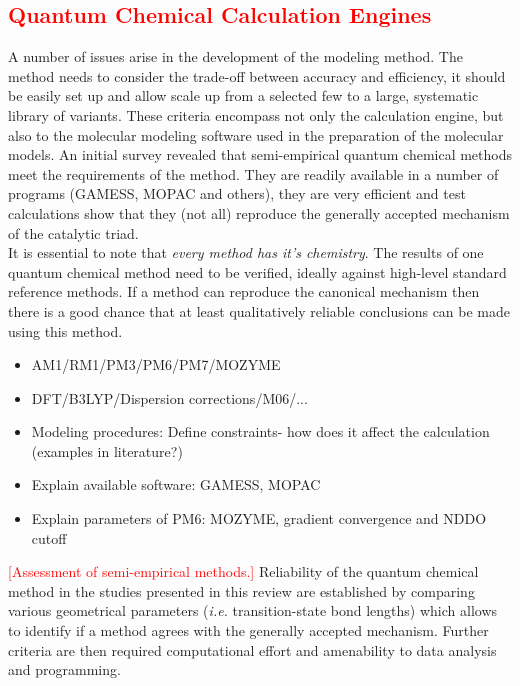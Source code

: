 \subsection{\textcolor{red}{Quantum Chemical Calculation Engines}}\label{sec:quantum_chemical_methods}
A number of issues arise in the development of the modeling method.
The method needs to consider the trade-off between accuracy and efficiency, it should be easily set up and allow scale up from a selected few to a large, systematic library of variants.
These criteria encompass not only the calculation engine, but also to the molecular modeling software used in the preparation of the molecular models.
An initial survey revealed that semi-empirical quantum chemical methods meet the requirements of the method.
They are readily available in a number of programs (GAMESS, MOPAC and others), they are very efficient and test calculations show that they (not all) reproduce the generally accepted mechanism of the catalytic triad.\\
It is essential to note that \textit{every method has it's chemistry}.
The results of one quantum chemical method need to be verified, ideally against high-level standard reference methods.
If a method can reproduce the canonical mechanism then there is a good chance that at least qualitatively reliable conclusions can be made using this method.
\begin{itemize}
\item AM1/RM1/PM3/PM6/PM7/MOZYME
\item DFT/B3LYP/Dispersion corrections/M06/...
\item Modeling procedures: Define constraints- how does it affect the calculation (examples in literature?)
\item Explain available software: GAMESS, MOPAC
\item Explain parameters of PM6: MOZYME, gradient convergence and NDDO cutoff
\end{itemize}
\textcolor{red}{[Assessment of semi-empirical methods.]}
Reliability of the quantum chemical method in the studies presented in this review are established by comparing various geometrical parameters (\textit{i.e.} transition-state bond lengths) which allows to identify if a method agrees with the generally accepted mechanism.
Further criteria are then required computational effort and amenability to data analysis and programming.\\

